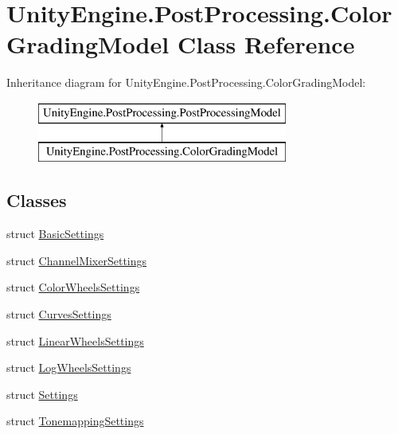 \hypertarget{class_unity_engine_1_1_post_processing_1_1_color_grading_model}{}\section{Unity\+Engine.\+Post\+Processing.\+Color\+Grading\+Model Class Reference}
\label{class_unity_engine_1_1_post_processing_1_1_color_grading_model}
Inheritance diagram for Unity\+Engine.\+Post\+Processing.\+Color\+Grading\+Model\+:\begin{figure}[H]
\begin{center}
\leavevmode
\includegraphics[height=2.000000cm]{class_unity_engine_1_1_post_processing_1_1_color_grading_model}
\end{center}
\end{figure}
\subsection*{Classes}
\begin{DoxyCompactItemize}
\item 
struct \mbox{\hyperlink{struct_unity_engine_1_1_post_processing_1_1_color_grading_model_1_1_basic_settings}{Basic\+Settings}}
\item 
struct \mbox{\hyperlink{struct_unity_engine_1_1_post_processing_1_1_color_grading_model_1_1_channel_mixer_settings}{Channel\+Mixer\+Settings}}
\item 
struct \mbox{\hyperlink{struct_unity_engine_1_1_post_processing_1_1_color_grading_model_1_1_color_wheels_settings}{Color\+Wheels\+Settings}}
\item 
struct \mbox{\hyperlink{struct_unity_engine_1_1_post_processing_1_1_color_grading_model_1_1_curves_settings}{Curves\+Settings}}
\item 
struct \mbox{\hyperlink{struct_unity_engine_1_1_post_processing_1_1_color_grading_model_1_1_linear_wheels_settings}{Linear\+Wheels\+Settings}}
\item 
struct \mbox{\hyperlink{struct_unity_engine_1_1_post_processing_1_1_color_grading_model_1_1_log_wheels_settings}{Log\+Wheels\+Settings}}
\item 
struct \mbox{\hyperlink{struct_unity_engine_1_1_post_processing_1_1_color_grading_model_1_1_settings}{Settings}}
\item 
struct \mbox{\hyperlink{struct_unity_engine_1_1_post_processing_1_1_color_grading_model_1_1_tonemapping_settings}{Tonemapping\+Settings}}
\end{DoxyCompactItemize}
